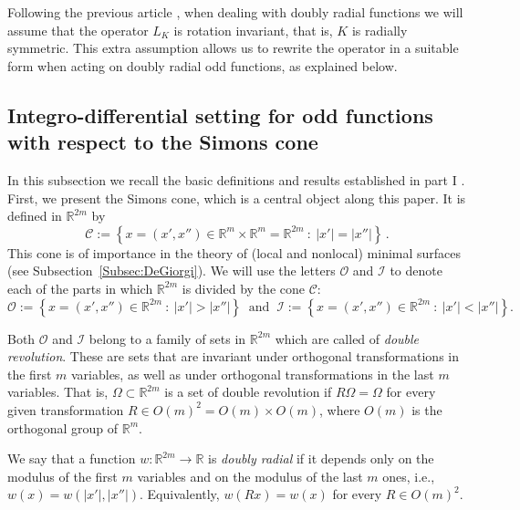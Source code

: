 \documentclass[12pt,reqno]{amsart}
\theoremstyle{definition}
\theoremstyle{remark}
\newcommand{\con}[1]{\mathbb{#1}}
\newcommand{\R}{\con{R}} %
\newcommand{\ccal}{\mathscr{C}}
\newcommand{\ical}{\mathcal{I}}
\newcommand{\ocal}{\mathcal{O}}
\newcommand{\setcond}[2]{\left \{ #1 \ : \ #2  \right \}}
\numberwithin{equation}{section}
\begin{document}
Following the previous article \cite{FelipeSanz-Perela:IntegroDifferentialI}, when dealing with doubly radial functions we will assume that the operator $L_K$ is rotation invariant, that is, $K$ is radially symmetric. This extra assumption allows us to rewrite the operator in a suitable form when acting on doubly radial odd functions, as explained below.


\subsection{Integro-differential setting for odd functions with respect to the Simons cone}
\label{Subsec:Integro-differential setting}


In this subsection we recall the basic definitions and results established in part I \cite{FelipeSanz-Perela:IntegroDifferentialI}. First, we present the Simons cone, which is a central object along this paper. It is defined in $\R^{2m}$ by
$$
\mathscr{C} := \setcond{x = (x', x'') \in \R^m \times \R^m = \R^{2m}}{|x'| = |x''|}\,.
$$
This cone is of importance in the theory of (local and nonlocal) minimal surfaces (see Subsection~\ref{Subsec:DeGiorgi}). We will use the letters $\ocal$ and $\ical$ to denote each of the parts in which $\R^{2m}$ is divided by the cone $\ccal$:
$$
\ocal:= \setcond{x = (x', x'') \in \R^{2m}}{|x'| > |x''|} \ \textrm{ and } \
\ical:= \setcond{x = (x', x'') \in \R^{2m}}{|x'| < |x''|}.
$$

Both $\ocal$ and $\ical$ belong to a family of sets in $\R^{2m}$ which are called of \emph{double revolution}. These are sets that are invariant under orthogonal transformations in the first $m$ variables, as well as under orthogonal transformations in the last $m$ variables. That is, $\Omega\subset \R^{2m}$ is a set of double revolution if $R\Omega = \Omega$ for every given transformation $R\in O(m)^2 = O(m) \times O(m)$, where  $O(m)$ is the orthogonal group of $\R^m$.


We say that a function $w:\R^{2m}  \to \R$ is \emph{doubly radial} if it depends only on the modulus of the first $m$ variables and on the modulus of the last $m$ ones, i.e., $w(x) = w(|x'|,|x''|)$. Equivalently, $w(Rx) = w(x)$ for every $R \in O(m)^2$.
\end{document}
